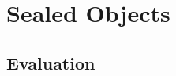 \documentclass[main.tex]{subfiles}
\begin{document}
\onlyinsubfile{\mainmatter{}}

\chapter{Sealed Objects}

\section{Evaluation}

\biblio{}
\onlyinsubfile{\glsaddall\printglossaries}
\end{document}
